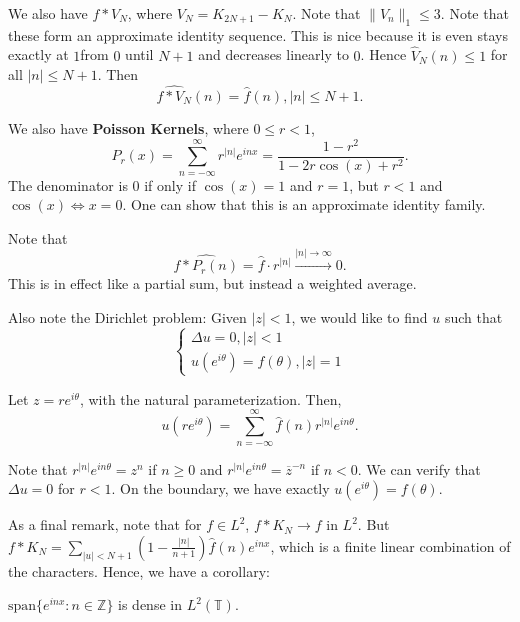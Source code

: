 \documentclass[11pt]{scrartcl}
\newcommand{\Z}{\mathbb{Z}}
\newcommand{\T}{\mathbb T}
\let \hat \widehat
\newcommand{\<}{\langle}
\renewcommand{\>}{\rangle}
\begin{document}
We also have $f*V_N$, where $V_N = K_{2N+1} - K_N$.  Note that $\|V_n\|_1 \le 3.$  Note that these form an approximate identity sequence.  This is nice because it is even stays exactly at $1$from $0$ until $N+1$ and decreases linearly to $0$.  Hence $\hat{V}_N(n) \le 1$ for all $|n| \le N+1$.  Then
$$\hat{f*V_N}(n) = \hat{f}(n), |n| \le N+1.$$

We also have \textbf{Poisson Kernels}, where $0 \le r < 1$, $$P_r(x) = \sum_{n = -\infty}^\infty r^{|n|}e^{inx}= \frac{1-r^2}{1-2r\cos(x) + r^2}.$$
The denominator is $0$ if only if $\cos(x) = 1$ and $r = 1$, but $r < 1$ and $\cos(x) \Leftrightarrow x = 0$.  One can show that this is an approximate identity family.

Note that 
$$\hat{f * P_r(n)} = \hat{f} \cdot r^{|n|} \xrightarrow{|n| \rightarrow \infty} 0.$$
This is in effect like a partial sum, but instead a weighted average.

Also note the Dirichlet problem:  Given $|z| < 1$, we would like to find $u$ such that $$\begin{cases} \Delta u = 0, |z| < 1 \\ u(e^{i\theta}) = f(\theta), |z| = 1\end{cases}$$

Let $z = re^{i\theta}$, with the natural parameterization.  
Then, 
$$u(re^{i\theta}) = \sum_{n = -\infty}^{\infty} \hat{f}(n)r^{|n|} e^{in\theta}.$$

Note that $r^{|n|}e^{in\theta} = z^n$ if $n \ge 0$ and $r^{|n|}e^{in\theta} = \overline{z}^{-n}$ if $n < 0$.
We can verify that $\Delta u = 0$ for $r < 1$.  On the boundary, we have exactly $u(e^{i\theta}) = f(\theta)$.

As a final remark, note that for $f \in L^2$, $f * K_N \rightarrow f$ in $L^2$.  But $f*K_N = \sum_{|u| < N+1}(1 - \frac{|n|}{n+1})\hat{f}(n)e^{inx}$, which is a finite linear combination of the characters.  Hence, we have a corollary:
\begin{corollary} $\text{span}\{e^{inx}: n \in \Z\}$ is dense in $L^2(\T)$.
\end{corollary}
\end{document}
